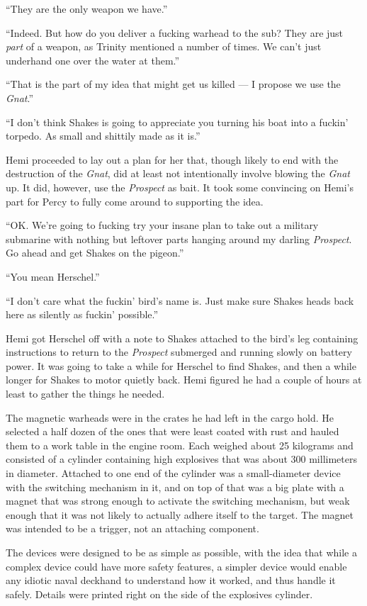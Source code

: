 \documentclass[]{scrbook}
\begin{document}
``They are the only weapon we have.''

``Indeed. But how do you deliver a fucking warhead to the sub? They are
just \emph{part} of a weapon, as Trinity mentioned a number of times. We
can't just underhand one over the water at them.''

``That is the part of my idea that might get us killed --- I propose we
use the \emph{Gnat}.''

``I don't think Shakes is going to appreciate you turning his boat into
a fuckin' torpedo. As small and shittily made as it is.''

Hemi proceeded to lay out a plan for her that, though likely to end with
the destruction of the \emph{Gnat}, did at least not intentionally
involve blowing the \emph{Gnat} up. It did, however, use the
\emph{Prospect} as bait. It took some convincing on Hemi's part for
Percy to fully come around to supporting the idea.

``OK. We're going to fucking try your insane plan to take out a military
submarine with nothing but leftover parts hanging around my darling
\emph{Prospect}. Go ahead and get Shakes on the pigeon.''

``You mean Herschel.''

``I don't care what the fuckin' bird's name is. Just make sure Shakes
heads back here as silently as fuckin' possible.''

Hemi got Herschel off with a note to Shakes attached to the bird's leg
containing instructions to return to the \emph{Prospect} submerged and
running slowly on battery power. It was going to take a while for
Herschel to find Shakes, and then a while longer for Shakes to motor
quietly back. Hemi figured he had a couple of hours at least to gather
the things he needed.

The magnetic warheads were in the crates he had left in the cargo hold.
He selected a half dozen of the ones that were least coated with rust
and hauled them to a work table in the engine room. Each weighed about
25 kilograms and consisted of a cylinder containing high explosives that
was about 300 millimeters in diameter. Attached to one end of the
cylinder was a small-diameter device with the switching mechanism in it,
and on top of that was a big plate with a magnet that was strong enough
to activate the switching mechanism, but weak enough that it was not
likely to actually adhere itself to the target. The magnet was intended
to be a trigger, not an attaching component.

The devices were designed to be as simple as possible, with the idea
that while a complex device could have more safety features, a simpler
device would enable any idiotic naval deckhand to understand how it
worked, and thus handle it safely. Details were printed right on the
side of the explosives cylinder.
\end{document}
